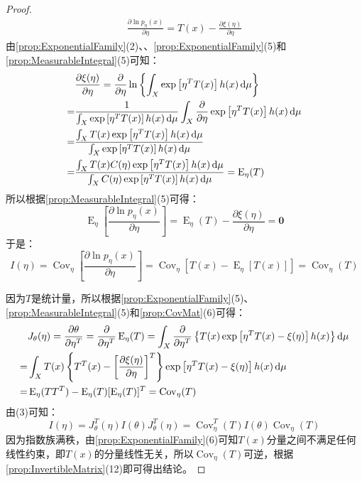 \begin{proof}
\begin{gather*}
		\frac{\partial\ln p_{\eta}(x)}{\partial\eta}=T(x)-\frac{\partial\xi(\eta)}{\partial\eta}
	\end{gather*}
	由\cref{prop:ExponentialFamily}(2)、、\cref{prop:ExponentialFamily}(5)和\cref{prop:MeasurableIntegral}(5)可知：
	\begin{align*}
		&\frac{\partial\xi(\eta)}{\partial\eta}=\frac{\partial}{\partial\eta}\ln\left\{\int_{X}\exp\left[\eta^TT(x)\right]h(x)\mathop{}\!\mathrm{d}\mu\right\} \\
		=&\frac{1}{\int_{X}\exp\left[\eta^TT(x)\right]h(x)\mathop{}\!\mathrm{d}\mu}\int_{X}\frac{\partial}{\partial\eta}\exp\left[\eta^TT(x)\right]h(x)\mathop{}\!\mathrm{d}\mu \\
		=&\frac{\int_{X}T(x)\exp\left[\eta^TT(x)\right]h(x)\mathop{}\!\mathrm{d}\mu}{\int_{X}\exp\left[\eta^TT(x)\right]h(x)\mathop{}\!\mathrm{d}\mu} \\
		=&\frac{\int_{X}T(x)C(\eta)\exp\left[\eta^TT(x)\right]h(x)\mathop{}\!\mathrm{d}\mu}{\int_{X}C(\eta)\exp\left[\eta^TT(x)\right]h(x)\mathop{}\!\mathrm{d}\mu}=\operatorname{E}_{\eta}(T)
	\end{align*}
	所以根据\cref{prop:MeasurableIntegral}(5)可得：
	\begin{equation*}
			\operatorname{E}_{\eta}\left[\frac{\partial\ln p_{\eta}(x)}{\partial\eta}\right]=\operatorname{E}_{\eta}(T)-\frac{\partial\xi(\eta)}{\partial\eta}=\mathbf{0}
	\end{equation*}
	于是：
	\begin{equation*}
		I(\eta)=\operatorname{Cov}_{\eta}\left[\frac{\partial\ln p_{\eta}(x)}{\partial\eta}\right]=\operatorname{Cov}_{\eta}[T(x)-\operatorname{E}_{\eta}[T(x)]]=\operatorname{Cov}_{\eta}(T)
	\end{equation*}\par
	因为$T$是统计量，所以根据\cref{prop:ExponentialFamily}(5)、\cref{prop:MeasurableIntegral}(5)和\cref{prop:CovMat}(6)可得：
	\begin{align*}
		&J_{\theta}(\eta)=\frac{\partial\theta}{\partial\eta^T}=\frac{\partial}{\partial\eta^T}\operatorname{E}_{\eta}(T)=\int_{X}\frac{\partial}{\partial\eta^T}\left\{T(x)\exp\left[\eta^TT(x)-\xi(\eta)\right]h(x)\right\}\mathop{}\!\mathrm{d}\mu \\
		=&\int_{X}T(x)\left\{T^T(x)-\left[\frac{\partial\xi(\eta)}{\partial\eta}\right]^T\right\}\exp\left[\eta^TT(x)-\xi(\eta)\right]h(x)\mathop{}\!\mathrm{d}\mu \\
		=&\operatorname{E}_{\eta}(TT^T)-\operatorname{E}_{\eta}(T)[\operatorname{E}_{\eta}(T)]^T=\operatorname{Cov}_{\eta}(T)
	\end{align*}
	由(3)可知：
	\begin{equation*}
		I(\eta)=J_{\theta}^T(\eta)I(\theta)J_{\theta}^T(\eta)=\operatorname{Cov}_{\eta}^T(T)I(\theta)\operatorname{Cov}_{\eta}(T)
	\end{equation*}
	因为指数族满秩，由\cref{prop:ExponentialFamily}(6)可知$T(x)$分量之间不满足任何线性约束，即$T(x)$的分量线性无关，所以$\operatorname{Cov}_{\eta}(T)$可逆，根据\cref{prop:InvertibleMatrix}(12)即可得出结论。
\end{proof}
